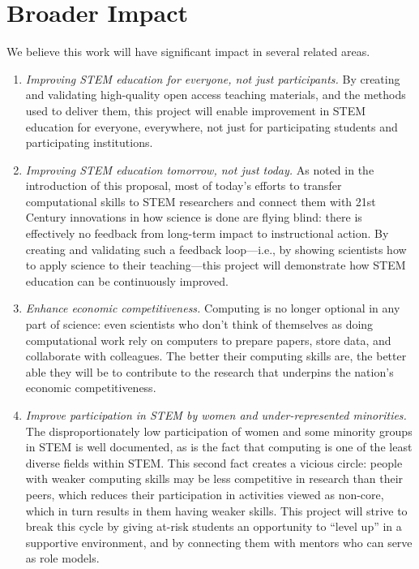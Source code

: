 \documentclass[11pt]{article}
\begin{document}
\section{Broader Impact}

We believe this work will have significant impact in several related
areas.

\begin{enumerate}

\item
  \emph{Improving STEM education for everyone, not just participants.}
  By creating and validating high-quality open access teaching
  materials, and the methods used to deliver them, this project will
  enable improvement in STEM education for everyone, everywhere, not
  just for participating students and participating institutions.

\item
  \emph{Improving STEM education tomorrow, not just today.}  As noted
  in the introduction of this proposal, most of today's efforts to
  transfer computational skills to STEM researchers and connect them
  with 21st Century innovations in how science is done are flying
  blind: there is effectively no feedback from long-term impact to
  instructional action.  By creating and validating such a feedback
  loop---i.e., by showing scientists how to apply science to their
  teaching---this project will demonstrate how STEM education can be
  continuously improved.

\item
  \emph{Enhance economic competitiveness.} Computing is no longer
  optional in any part of science: even scientists who don't think of
  themselves as doing computational work rely on computers to prepare
  papers, store data, and collaborate with colleagues.  The better
  their computing skills are, the better able they will be to
  contribute to the research that underpins the nation's economic
  competitiveness.

\item
  \emph{Improve participation in STEM by women and under-represented
    minorities.} The disproportionately low participation of women and
  some minority groups in STEM is well documented, as is the fact that
  computing is one of the least diverse fields within STEM.  This
  second fact creates a vicious circle: people with weaker computing
  skills may be less competitive in research than their peers, which
  reduces their participation in activities viewed as non-core, which
  in turn results in them having weaker skills.  This project will
  strive to break this cycle by giving at-risk students an opportunity
  to ``level up'' in a supportive environment, and by connecting them
  with mentors who can serve as role models.

\end{enumerate}
\end{document}

